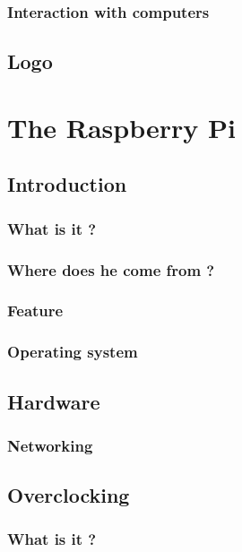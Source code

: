 \documentclass[10pt,a4paper]{article}
\begin{document}
\subsubsection{Interaction with computers}

\subsection{Logo}

\section{The Raspberry Pi}

\subsection{Introduction}

\subsubsection{What is it ?}

\subsubsection{Where does he come from ?}

\subsubsection{Feature}

\subsubsection{Operating system}

\subsection{Hardware}

\subsubsection{Networking}

\subsection{Overclocking}

\subsubsection{What is it ?}
\end{document}
